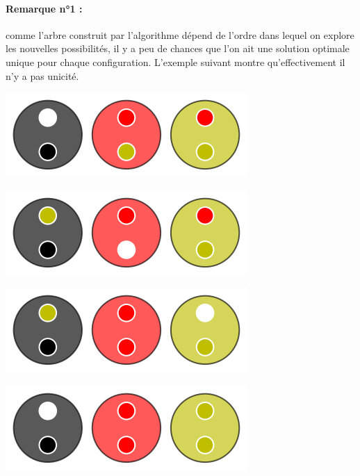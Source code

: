 \medskip

\paragraph{Remarque n°1 :} \hspace{-1em} comme l'arbre construit  par l'algorithme  dépend de l'ordre dans lequel on explore les nouvelles possibilités, il y a peu de chances que l'on ait une solution optimale unique pour chaque configuration. L'exemple suivant montre qu'effectivement il n'y a pas unicité.

\vspace{-0.4em}
\begin{multicols}{2}
    \begin{center}   %
        \includegraphics[scale=0.25]{content/optimal/tree_sol/no_unicity/sol_1/000.png}

        \includegraphics[scale=0.25]{content/optimal/tree_sol/no_unicity/sol_1/001.png}

        \includegraphics[scale=0.25]{content/optimal/tree_sol/no_unicity/sol_1/002.png}

        \includegraphics[scale=0.25]{content/optimal/tree_sol/no_unicity/sol_1/003.png}
    \end{center}


\end{multicols}
